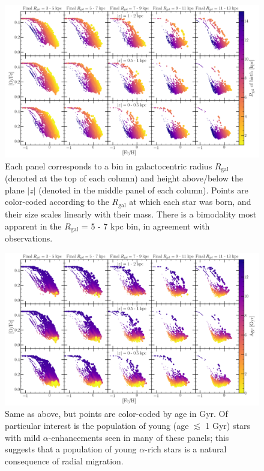 \documentclass[12pt]{report}
\begin{document}
\begin{figure}[!h] 
\centering 
\includegraphics[scale = 0.3]{../plots/rgal_birth/hayden2015plot/moddisk_vigorousSF.png} 
\caption{Each panel corresponds to a bin in galactocentric radius 
$R_\text{gal}$ (denoted at the top of each column) and height above/below the 
plane $\left|z\right|$ (denoted in the middle panel of each column). Points 
are color-coded according to the $R_\text{gal}$ at which each star was born, 
and their size scales linearly with their mass. There is a bimodality most 
apparent in the $R_\text{gal}$ = 5 - 7 kpc bin, in agreement with 
observations.} 
\label{fig:rgal_birth:hayden2015plot:moddisk_vigorousSF} 
\end{figure} 

\begin{figure}[!h] 
\centering 
\includegraphics[scale = 0.3]{../plots/age/hayden2015plot/moddisk_vigorousSF.png}
\caption{
Same as above, but points are color-coded by age in Gyr. Of particular 
interest is the population of young (age $\lesssim$ 1 Gyr) stars with mild 
$\alpha$-enhancements seen in many of these panels; this suggests that a 
population of young $\alpha$-rich stars is a natural consequence of radial 
migration. 
} 
\label{fig:age:hayden2015plot:moddisk_vigorousSF} 
\end{figure} 
\end{document}

